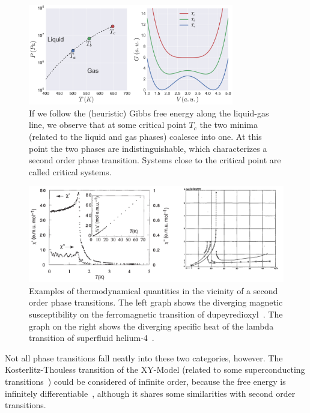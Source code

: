 \begin{figure}
\begin{center}
    \includegraphics[width=0.8\textwidth]{chapters/ch2-crit/figs/gibbs2}
\end{center}
\caption{If we follow the (heuristic) Gibbs free energy along the liquid-gas
    line, we observe that at some critical point $T_c$ the two minima (related
    to the liquid and gas phases) coalesce into one. At this point the two
    phases are indistinguishable, which characterizes a second order phase
    transition. Systems close to the critical point are called critical
    systems.}
\label{fig:gibbs2}
\end{figure}


\begin{figure}
\begin{center}
    \includegraphics[width=1.0\textwidth]{chapters/ch2-crit/figs/suscep}
\end{center}
\caption{Examples of thermodynamical quantities in the vicinity of a second
    order phase transitions. The left graph shows the diverging magnetic
    susceptibility on the ferromagnetic transition of
    dupeyredioxyl~\cite{Chiarelli1993}. The graph on the right shows the
    diverging specific heat of the lambda transition of superfluid
    helium-4~\cite{Keesom1935}.}
\label{fig:suscep}
\end{figure}

Not all phase transitions fall neatly into these two categories, however. The
Kosterlitz-Thouless transition of the XY-Model (related to some superconducting
transitions~\cite{Resnick1981}) could be considered of infinite order, because
the free energy is infinitely differentiable~\cite{Kosterlitz1973}, although it
shares some similarities with second order transitions.

